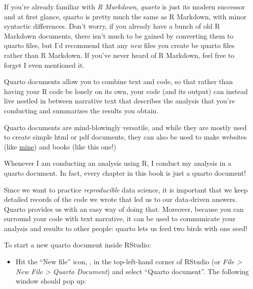 \documentclass[
  letterpaper,
  DIV=11,
  numbers=noendperiod]{scrreprt}
\providecommand{\tightlist}{%
  \setlength{\itemsep}{0pt}\setlength{\parskip}{0pt}}\usepackage{longtable,booktabs,array}
\begin{document}
\begin{tcolorbox}[enhanced jigsaw, rightrule=.15mm, toptitle=1mm, title=\textcolor{quarto-callout-note-color}{\faInfo}\hspace{0.5em}{Quarto versus R Markdown}, leftrule=.75mm, bottomtitle=1mm, colbacktitle=quarto-callout-note-color!10!white, coltitle=black, titlerule=0mm, opacityback=0, colframe=quarto-callout-note-color-frame, arc=.35mm, opacitybacktitle=0.6, bottomrule=.15mm, left=2mm, breakable, toprule=.15mm, colback=white]

If you're already familiar with \emph{R Markdown}, \emph{quarto} is just
its modern successor and at first glance, quarto is pretty much the same
as R Markdown, with minor syntactic differences. Don't worry, if you
already have a bunch of old R Markdown documents, there isn't much to be
gained by converting them to quarto files, but I'd recommend that any
\emph{new} files you create be quarto files rather than R Markdown. If
you've never heard of R Markdown, feel free to forget I even mentioned
it.

\end{tcolorbox}

Quarto documents allow you to combine text and code, so that rather than
having your R code be lonely on its own, your code (and its output) can
instead live nestled in between narrative text that describes the
analysis that you're conducting and summarizes the results you obtain.

Quarto documents are mind-blowingly versatile, and while they are mostly
used to create simple html or pdf documents, they can also be used to
make websites (like \href{www.rebeccabarter.com}{mine}) and books (like
this one!)

Whenever I am conducting an analysis using R, I conduct my analysis in a
quarto document. In fact, every chapter in this book is just a quarto
document!

Since we want to practice \emph{reproducible} data science, it is
important that we keep detailed records of the code we wrote that led us
to our data-driven answers. Quarto provides us with an easy way of doing
that. Moreover, because you can surround your code with text narrative,
it can be used to communicate your analysis and results to other people:
quarto lets us feed two birds with one seed!

To start a new quarto document inside RStudio:

\begin{itemize}
\tightlist
\item
  Hit the ``New file'' icon, , in the top-left-hand corner of RStudio
  (or \emph{File \textgreater{} New File \textgreater{} Quarto
  Document}) and select ``Quarto document''. The following window should
  pop up:
\end{itemize}
\end{document}
